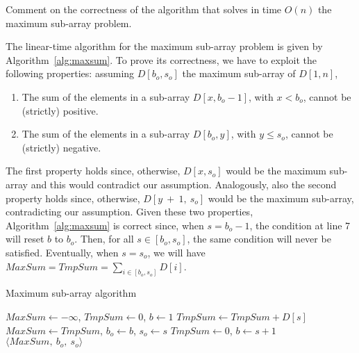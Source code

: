 \exercise

Comment on the correctness of the algorithm that solves in time $O(n)$ the
maximum sub-array problem.

\solution

The linear-time algorithm for the maximum sub-array problem is given by
Algorithm~\ref{alg:maxsum}. To prove its correctness, we have to exploit the
following properties: assuming $D[b_o, s_o]$ the maximum sub-array of $D[1, n]$,
%
\begin{enumerate}
  \item The sum of the elements in a sub-array $D[x, b_o - 1]$, with $x < b_o$,
  cannot be (strictly) positive.
  \item The sum of the elements in a sub-array $D[b_o, y]$, with $y \le s_o$,
  cannot be (strictly) negative.
\end{enumerate}
%
The first property holds since, otherwise, $D[x, s_o]$ would be the maximum
sub-array and this would contradict our assumption. Analogously, also the second
property holds since, otherwise, $D[y~+~1,~s_o]$ would be the maximum sub-array,
contradicting our assumption. Given these two properties,
Algorithm~\ref{alg:maxsum} is correct since, when $s = b_o - 1$, the condition
at line 7 will reset $b$ to $b_o$. Then, for all $s \in [b_o, s_o]$, the same
condition will never be satisfied. Eventually, when $s = s_o$, we will have
$MaxSum = TmpSum = \sum_{i \in [b_o, s_o]} D[i]$.
%
\begin{algorithm}[h]
\caption{Maximum sub-array algorithm}\label{alg:maxsum}
\begin{algorithmic}[1]
\State $MaxSum \gets -\infty$, $TmpSum \gets 0$, $b \gets 1$
\State $TmpSum \gets TmpSum + D[s]$
\State $MaxSum \gets TmpSum$, $b_o \gets b$, $s_o \gets s$
\EndIf
{}
\State $TmpSum \gets 0$, $b \gets s + 1$
\EndIf
\EndFor
\State \Return $\langle MaxSum,\ b_o,\ s_o \rangle$
\end{algorithmic}
\end{algorithm}
